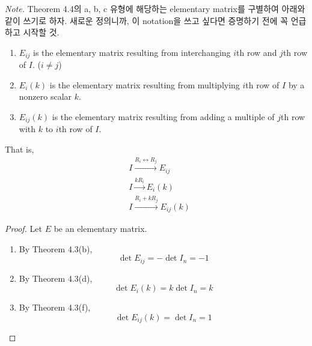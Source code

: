\textit{Note.} Theorem 4.4의 a, b, c 유형에 해당하는 elementary matrix를 구별하여 아래와 같이 쓰기로 하자. 새로운 정의니까, 이 notation을 쓰고 싶다면 증명하기 전에 꼭 언급하고 시작할 것.
\begin{enumerate}
	\item $E_{ij}$ is the elementary matrix resulting from interchanging $i$th row and $j$th row of $I$. ($i \neq j$)
	\item $E_i(k)$ is the elementary matrix resulting from multiplying $i$th row of $I$ by a nonzero scalar $k$.
	\item $E_{ij}(k)$ is the elementary matrix resulting from adding a multiple of $j$th row with $k$ to $i$th row of $I$.
\end{enumerate}
That is, \begin{align*}
	&I \xrightarrow{R_i \leftrightarrow R_j} E_{ij} \\
	&I \xrightarrow{kR_i} E_i(k) \\
	&I \xrightarrow{R_i + kR_j} E_{ij}(k)
\end{align*}

\begin{proof}
	Let $E$ be an \nbyn elementary matrix.
	\begin{enumerate}
		\item By Theorem 4.3(b),
		\begin{equation*}
			\det{E_{ij}} = -\det{I_n} = -1
		\end{equation*}
		\item By Theorem 4.3(d),
		\begin{equation*}
		\det{E_i(k)} = k\det{I_n} = k
		\end{equation*}
		\item By Theorem 4.3(f),
		\begin{equation*}
		\det{E_{ij}(k)} = \det{I_n} = 1
		\end{equation*}
	\end{enumerate}
\end{proof}

